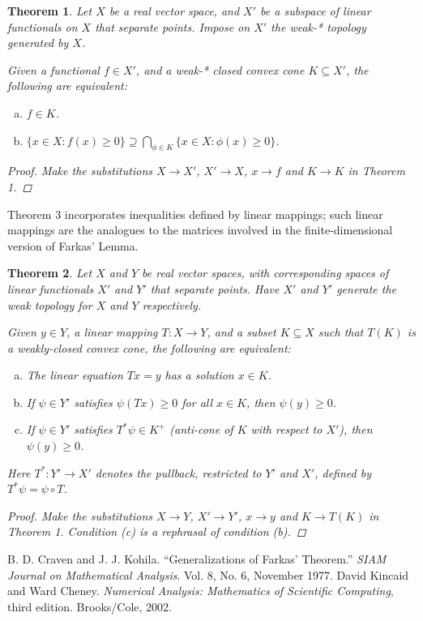\documentclass[12pt]{article}
\newtheorem{thm}{Theorem}
\begin{document}
\begin{thm}
Let $X$ be a real vector space, and $X'$ 
be a subspace of linear functionals on 
$X$ that separate points. 
Impose on $X'$ the weak-* topology generated by $X$.

Given a functional $f \in X'$, and a weak-* closed convex cone 
$K \subseteq X'$, 
the following are equivalent:
\begin{enumerate}[(a)]
\item
$f \in K$.
\item
$\{ x \in X\colon f(x) \geq 0\} \supseteq \bigcap_{\phi \in K} \{ x \in X \colon
 \phi(x) \geq 0 \}$.
\end{enumerate}

\begin{proof}
Make the substitutions $X \to X'$, $X' \to X$, $x \to f$
and $K \to K$ in Theorem 1.
\end{proof}
\end{thm}

Theorem 3 incorporates inequalities defined
by linear mappings; such linear mappings are the analogues to the matrices
involved in the finite-dimensional version of Farkas' Lemma.

\begin{thm}
Let $X$ and $Y$ be real vector spaces,
with corresponding spaces of linear functionals $X'$ and $Y'$
that separate points.
Have $X'$ and $Y'$ generate the weak topology for $X$ and $Y$
respectively.

Given $y \in Y$, 
a linear mapping $T\colon X \to Y$, and
a subset $K \subseteq X$ such that $T(K)$ is a weakly-closed convex cone,
the following are equivalent:
\begin{enumerate}[(a)]
\item
The linear equation $Tx = y$ has a solution $x \in K$.
\item
If $\psi \in Y'$ satisfies $\psi(Tx) \geq 0$ for all $x \in K$,
then $\psi(y) \geq 0$.
\item
If $\psi \in Y'$ satisfies
$T^* \psi \in K^+$ (anti-cone of $K$ with respect to $X'$), 
then $\psi(y) \geq 0$.
\end{enumerate}
Here $T^* \colon Y' \to X'$ denotes the pullback, restricted to $Y'$ and $X'$,
defined by $T^* \psi = \psi \circ T$.
\begin{proof}
Make the substitutions $X \to Y$, $X' \to Y'$, $x \to y$ and $K \to T(K)$ in Theorem 1.
Condition (c) is a rephrasal of condition (b).
\end{proof}
\end{thm}

\begin{thebibliography}{6}
B. D. Craven and J. J. Kohila.
``Generalizations of Farkas' Theorem.''
\emph{SIAM Journal on Mathematical Analysis}. 
Vol. 8, No. 6, November 1977.
David Kincaid and Ward Cheney. 
\emph{Numerical Analysis: Mathematics of Scientific Computing},
third edition. Brooks/Cole, 2002.
\end{thebibliography}

\end{document}
